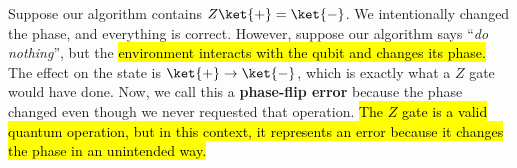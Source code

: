 \highspace
Suppose our algorithm contains $Z\ket{+} = \ket{-}$. We intentionally changed the phase, and everything is correct. However, suppose our algorithm says ``\emph{do nothing}'', but the \hl{environment interacts with the qubit and changes its phase.} The effect on the state is $\ket{+} \to \ket{-}$, which is exactly what a $Z$ gate would have done. Now, we call this a \textbf{phase-flip error} because the phase changed even though we never requested that operation. \hl{The $Z$ gate is a valid quantum operation, but in this context, it represents an error because it changes the phase in an unintended way.}